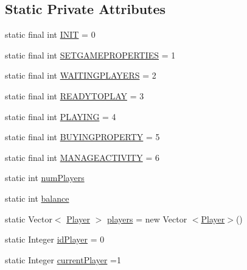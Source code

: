 \subsection*{Static Private Attributes}
\begin{DoxyCompactItemize}
\item 
static final int \hyperlink{class_monopoly_1_1_server_1_1_game_protocol_a3a3f1fded8c4f1f318e17e12ab184611}{I\+N\+IT} = 0
\item 
static final int \hyperlink{class_monopoly_1_1_server_1_1_game_protocol_a08a159e70f29fbac3d5c34c3bb06a0f7}{S\+E\+T\+G\+A\+M\+E\+P\+R\+O\+P\+E\+R\+T\+I\+ES} = 1
\item 
static final int \hyperlink{class_monopoly_1_1_server_1_1_game_protocol_aaefb144ef04b6626e85327e05d61e3b5}{W\+A\+I\+T\+I\+N\+G\+P\+L\+A\+Y\+E\+RS} = 2
\item 
static final int \hyperlink{class_monopoly_1_1_server_1_1_game_protocol_a371d01ccb2c3660c6122d7703447f6c6}{R\+E\+A\+D\+Y\+T\+O\+P\+L\+AY} = 3
\item 
static final int \hyperlink{class_monopoly_1_1_server_1_1_game_protocol_a5078e6a0fa8bddf15f6e995e5d2b40a3}{P\+L\+A\+Y\+I\+NG} = 4
\item 
static final int \hyperlink{class_monopoly_1_1_server_1_1_game_protocol_ac5ba79972e1e2d496ed779fdd7ed36f3}{B\+U\+Y\+I\+N\+G\+P\+R\+O\+P\+E\+R\+TY} = 5
\item 
static final int \hyperlink{class_monopoly_1_1_server_1_1_game_protocol_aff46964565cfd870509e3e39dc8c86d1}{M\+A\+N\+A\+G\+E\+A\+C\+T\+I\+V\+I\+TY} = 6
\item 
static int \hyperlink{class_monopoly_1_1_server_1_1_game_protocol_aa9b4699a2e82882951136ffb1e01c64e}{num\+Players}
\item 
static int \hyperlink{class_monopoly_1_1_server_1_1_game_protocol_ad4eb56f1494064341fbf3556f17bd67a}{balance}
\item 
static Vector$<$ \hyperlink{class_monopoly_1_1_logic_1_1_player}{Player} $>$ \hyperlink{class_monopoly_1_1_server_1_1_game_protocol_ab7cff2b620c79623d1787e36ec5850f0}{players} = new Vector $<$\hyperlink{class_monopoly_1_1_logic_1_1_player}{Player}$>$()
\item 
static Integer \hyperlink{class_monopoly_1_1_server_1_1_game_protocol_a3ed87b0a6d4b81cd98ac415312a6fb75}{id\+Player} = 0
\item 
static Integer \hyperlink{class_monopoly_1_1_server_1_1_game_protocol_a1b2098ae57b398cc7920ccfd19e5399c}{current\+Player} =1
\item 

\end{DoxyCompactItemize}
